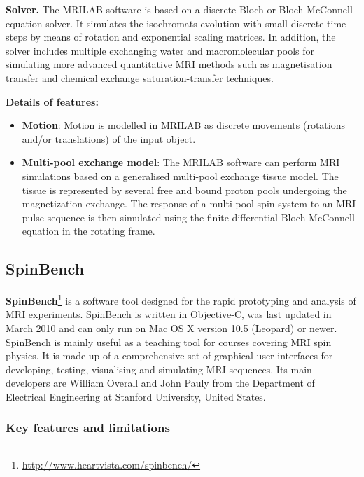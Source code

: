 \hfill

\textbf{Solver.} The MRILAB software is based on a discrete Bloch or Bloch-McConnell equation solver.
It simulates the isochromats evolution with small discrete time steps by means of rotation and exponential scaling matrices. 
In addition, the solver includes multiple exchanging water and macromolecular pools for simulating more advanced quantitative MRI methods such as magnetisation transfer and chemical exchange saturation-transfer techniques.

\hfill

\textbf{Details of features:}
\begin{itemize}
    
    \item \textbf{Motion}: Motion is modelled in MRILAB as discrete movements (rotations and/or translations) of the input object.
    
    \item \textbf{Multi-pool exchange model}: The MRILAB software can perform MRI simulations based on a generalised multi-pool exchange tissue model. 
    The tissue is represented by several free and bound proton pools undergoing the magnetization exchange.
    The response of a multi-pool spin system to an MRI pulse sequence is then simulated using the finite differential Bloch-McConnell equation in the rotating frame.
    
\end{itemize}

\hfill

\subsection{SpinBench}
\textbf{SpinBench}\footnote{\url{http://www.heartvista.com/spinbench/}} is a software tool designed for the rapid prototyping and analysis of MRI experiments.
SpinBench is written in Objective-C, was last updated in March 2010 and can only run on Mac OS X version 10.5 (Leopard) or newer.
SpinBench is mainly useful as a teaching tool for courses covering MRI spin physics.
It is made up of a comprehensive set of graphical user interfaces for developing, testing, visualising and simulating MRI sequences. 
Its main developers are William Overall and John Pauly from the Department of Electrical Engineering at Stanford University, United States.

\hfill

\subsubsection{Key features and limitations}

